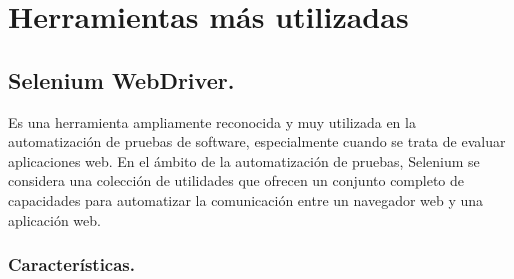 \documentclass[letterpaper]{article}
\begin{document}
\section{Herramientas más utilizadas}
\subsection{Selenium WebDriver.}
Es una herramienta ampliamente reconocida y muy utilizada en la automatización de pruebas de software, especialmente
cuando se trata de evaluar aplicaciones web. En el ámbito de la automatización de pruebas, Selenium se considera una
colección de utilidades que ofrecen un conjunto completo de capacidades para automatizar la comunicación entre un
navegador web y una aplicación web.

\subsubsection{Características.}
\end{document}
